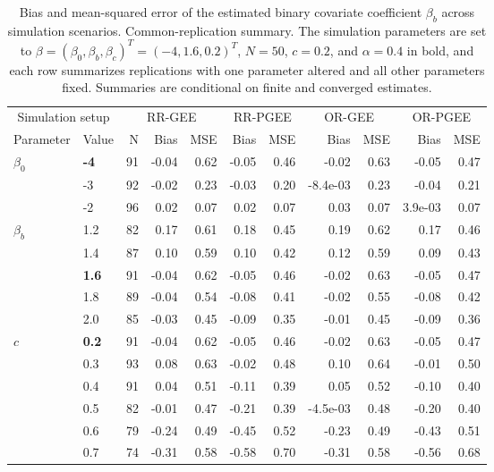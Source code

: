 \begin{table}[htbp]
\centering
\scriptsize
\setlength{\tabcolsep}{4pt}
\renewcommand{\arraystretch}{1.15}
\caption{Bias and mean-squared error of the estimated binary covariate coefficient $\beta_b$ across simulation scenarios. Common-replication summary. The simulation parameters are set to $\beta = (\beta_0, \beta_b, \beta_c)^T = (-4, 1.6, 0.2)^T$, $N = 50$, $c = 0.2$, and $\alpha = 0.4$ in bold, and each row summarizes replications with one parameter altered and all other parameters fixed. Summaries are conditional on finite and converged estimates.}
\begin{tabular}{ll|rrr|rr|rr|rr}
\hline
\multicolumn{2}{c|}{Simulation setup} & \multicolumn{3}{c|}{RR-GEE} & \multicolumn{2}{c|}{RR-PGEE} & \multicolumn{2}{c|}{OR-GEE} & \multicolumn{2}{c}{OR-PGEE} \\
Parameter & Value & N & Bias & MSE & Bias & MSE & Bias & MSE & Bias & MSE \\
\hline
$\beta_0$ & \textbf{-4} & 91 & -0.04 & 0.62 & -0.05 & 0.46 & -0.02 & 0.63 & -0.05 & 0.47 \\
 & -3 & 92 & -0.02 & 0.23 & -0.03 & 0.20 & -8.4e-03 & 0.23 & -0.04 & 0.21 \\
 & -2 & 96 & 0.02 & 0.07 & 0.02 & 0.07 & 0.03 & 0.07 & 3.9e-03 & 0.07 \\
\hline
$\beta_b$ & 1.2 & 82 & 0.17 & 0.61 & 0.18 & 0.45 & 0.19 & 0.62 & 0.17 & 0.46 \\
 & 1.4 & 87 & 0.10 & 0.59 & 0.10 & 0.42 & 0.12 & 0.59 & 0.09 & 0.43 \\
 & \textbf{1.6} & 91 & -0.04 & 0.62 & -0.05 & 0.46 & -0.02 & 0.63 & -0.05 & 0.47 \\
 & 1.8 & 89 & -0.04 & 0.54 & -0.08 & 0.41 & -0.02 & 0.55 & -0.08 & 0.42 \\
 & 2.0 & 85 & -0.03 & 0.45 & -0.09 & 0.35 & -0.01 & 0.45 & -0.09 & 0.36 \\
\hline
$c$ & \textbf{0.2} & 91 & -0.04 & 0.62 & -0.05 & 0.46 & -0.02 & 0.63 & -0.05 & 0.47 \\
 & 0.3 & 93 & 0.08 & 0.63 & -0.02 & 0.48 & 0.10 & 0.64 & -0.01 & 0.50 \\
 & 0.4 & 91 & 0.04 & 0.51 & -0.11 & 0.39 & 0.05 & 0.52 & -0.10 & 0.40 \\
 & 0.5 & 82 & -0.01 & 0.47 & -0.21 & 0.39 & -4.5e-03 & 0.48 & -0.20 & 0.40 \\
 & 0.6 & 79 & -0.24 & 0.49 & -0.45 & 0.52 & -0.23 & 0.49 & -0.43 & 0.51 \\
 & 0.7 & 74 & -0.31 & 0.58 & -0.58 & 0.70 & -0.31 & 0.58 & -0.56 & 0.68 \\

\end{tabular}
\end{table}
